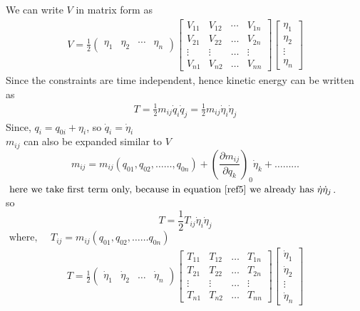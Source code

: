  We can write $V$ in matrix form as
\begin{align}
 V=\frac{1}{2}\left(\begin{array}{llll}
\eta_{1} & \eta_{2} & \cdots & \eta_{n}
\end{array}\right)\left[\begin{array}{cccc}
V_{11} & V_{12} & \cdots & V_{1 n} \\
V_{21} & V_{22} & \ldots & V_{2 n} \\
\vdots & \vdots & \ldots & \vdots \\
V_{n 1} & V_{n 2} & \ldots & V_{n n}
\end{array}\right]\left[\begin{array}{l}
\eta_{1} \\
\eta_{2} \\
\vdots \\
\eta_{n}
\end{array}\right]\label{ref4}
\end{align}
Since the constraints are time independent, hence kinetic energy can be written as
\begin{align}
T=\frac{1}{2} m_{i j} \dot{q}_{i} \dot{q}_{j}=\frac{1}{2} m_{i j} \dot{\eta}_{i} \dot{\eta}_{j}\label{ref5}
\end{align}
Since, $q_{i}=q_{0 i}+\eta_{i}$, so $\dot{q}_{i}=\dot{\eta}_{i}$\\
$m_{i j}$ can also be expanded similar to $V$
$$m_{i j}=m_{i j}\left(q_{01}, q_{02}, \ldots \ldots, q_{0 n}\right)+\left(\frac{\partial m_{i j}}{\partial q_{k}}\right)_{0} \dot{\eta}_{k}+\ldots \ldots \ldots$$
$\text { here we take first term only, because in equation $\ref{ref5}$ we already has } \dot{\eta} \dot{\eta}_{j} $.\\
so
\begin{equation}
T=\frac{1}{2} T_{i j} \dot{\eta}_{i} \dot{\eta}_{j}\label{ref6}
\end{equation}
$\text { where, } \quad T_{i j}=m_{i j}\left(q_{01}, q_{02}, \ldots \ldots q_{0 n}\right)$\\
\begin{align}
 T=\frac{1}{2}\left(\begin{array}{llll}
\dot{\eta}_{1} & \dot{\eta}_{2} & \ldots & \dot{\eta}_{n}
\end{array}\right)\left[\begin{array}{cccc}
T_{11} & T_{12} & \ldots & T_{1 n} \\
T_{21} & T_{22} & \ldots & T_{2 n} \\
\vdots & \vdots & \ldots & \vdots \\
T_{n 1} & T_{n 2} & \ldots & T_{n n}
\end{array}\right]\left[\begin{array}{l}
\dot{\eta}_{1} \\
\dot{\eta}_{2} \\
\vdots \\
\dot{\eta}_{n}
\end{array}\right]\label{ref7}
\end{align}
